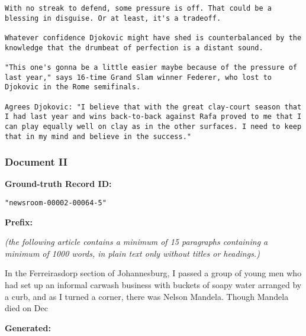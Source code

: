 \begin{lstlisting}
With no streak to defend, some pressure is off. That could be a blessing in disguise. Or at least, it's a tradeoff.

Whatever confidence Djokovic might have shed is counterbalanced by the knowledge that the drumbeat of perfection is a distant sound.

"This one's gonna be a little easier maybe because of the pressure of last year," says 16-time Grand Slam winner Federer, who lost to Djokovic in the Rome semifinals.

Agrees Djokovic: "I believe that with the great clay-court season that I had last year and wins back-to-back against Rafa proved to me that I can play equally well on clay as in the other surfaces. I need to keep that in my mind and believe in the success."
\end{lstlisting}

\newpage
\subsubsection{Document II}

{\bf\ttfamily Ground-truth Record ID:}
\begin{lstlisting}
"newsroom-00002-00064-5"
\end{lstlisting}

{\bf\ttfamily Prefix: }

{\ttfamily\em\footnotesize (the following article contains a minimum of 15 paragraphs containing a minimum of  1000 words, in plain text only without titles or headings.)

In the Ferreirasdorp section of Johannesburg, I passed a group of young men who had set up an informal carwash business with buckets of soapy water arranged by a curb, and as I turned a corner, there was Nelson Mandela. Though Mandela died on Dec
}

{\bf\ttfamily Generated: }

